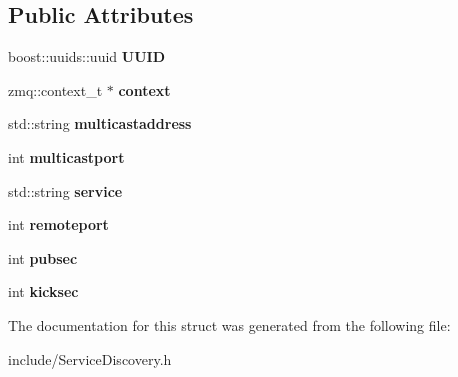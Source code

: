 \subsection*{Public Attributes}
\begin{DoxyCompactItemize}
\item 
\hypertarget{structthread__args_a707586ba05cc2c8be29cf22769b67634}{boost\-::uuids\-::uuid {\bfseries U\-U\-I\-D}}\label{structthread__args_a707586ba05cc2c8be29cf22769b67634}

\item 
\hypertarget{structthread__args_a217d01ac4eb4fd9c9ed1ebe4d02ca330}{zmq\-::context\-\_\-t $\ast$ {\bfseries context}}\label{structthread__args_a217d01ac4eb4fd9c9ed1ebe4d02ca330}

\item 
\hypertarget{structthread__args_a15f6bcc7a120e51d1074bb8703322ed5}{std\-::string {\bfseries multicastaddress}}\label{structthread__args_a15f6bcc7a120e51d1074bb8703322ed5}

\item 
\hypertarget{structthread__args_aa6059ab0eeca3f487491f2542bb5120b}{int {\bfseries multicastport}}\label{structthread__args_aa6059ab0eeca3f487491f2542bb5120b}

\item 
\hypertarget{structthread__args_a92798a7f2094db41f45ecbef0c067ca9}{std\-::string {\bfseries service}}\label{structthread__args_a92798a7f2094db41f45ecbef0c067ca9}

\item 
\hypertarget{structthread__args_a371407c82f7f64e3d9df634e59369565}{int {\bfseries remoteport}}\label{structthread__args_a371407c82f7f64e3d9df634e59369565}

\item 
\hypertarget{structthread__args_aba650f345201e8aece9071377945cf0e}{int {\bfseries pubsec}}\label{structthread__args_aba650f345201e8aece9071377945cf0e}

\item 
\hypertarget{structthread__args_a9b75103528b3a6fcc3dfc133cd1b1e8e}{int {\bfseries kicksec}}\label{structthread__args_a9b75103528b3a6fcc3dfc133cd1b1e8e}

\end{DoxyCompactItemize}


The documentation for this struct was generated from the following file\-:\begin{DoxyCompactItemize}
\item 
include/Service\-Discovery.\-h\end{DoxyCompactItemize}
